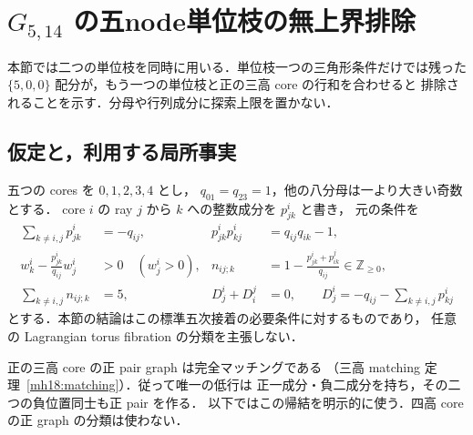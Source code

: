\section{\texorpdfstring{$G_{5,14}$}{G5,14} の五node単位枝の無上界排除}
\label{ug25:section}

本節では二つの単位枝を同時に用いる．単位枝一つの三角形条件だけでは残った
$\{5,0,0\}$ 配分が，もう一つの単位枝と正の三高 core の行和を合わせると
排除されることを示す．分母や行列成分に探索上限を置かない．

\subsection{仮定と，利用する局所事実}

五つの cores を $0,1,2,3,4$ とし，
$q_{01}=q_{23}=1$，他の八分母は一より大きい奇数とする．
core $i$ の ray $j$ から $k$ への整数成分を $p^i_{jk}$ と書き，
元の条件を
\begin{align}
 \sum_{k\ne i,j}p^i_{jk}&=-q_{ij},&
 p^i_{jk}p^i_{kj}&=q_{ij}q_{ik}-1,\label{ug25:local}\\
 w^i_k-\frac{p^i_{jk}}{q_{ij}}w^i_j&>0\quad(w^i_j>0),&
 n_{ij;k}&=1-\frac{p^i_{jk}+p^j_{ik}}{q_{ij}}\in\mathbb Z_{\ge0},
 \label{ug25:positive-node}\\
 \sum_{k\ne i,j}n_{ij;k}&=5,&
 D^i_j+D^j_i&=0,\qquad
 D^i_j=-q_{ij}-\sum_{k\ne i,j}p^i_{kj}
 \label{ug25:budget-D}
\end{align}
とする．本節の結論はこの標準五次接着の必要条件に対するものであり，
任意の Lagrangian torus fibration の分類を主張しない．

正の三高 core の正 pair graph は完全マッチングである
（三高 matching 定理~\ref{mh18:matching}）．従って唯一の低行は
正一成分・負二成分を持ち，その二つの負位置同士も正 pair を作る．
以下ではこの帰結を明示的に使う．四高 core の正 graph の分類は使わない．

